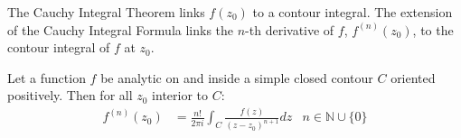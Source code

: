 \documentclass[12pt, english]{book}
\begin{document}
	
	The Cauchy Integral Theorem links \(f(z_0)\) to a contour integral. The extension of the Cauchy Integral Formula links the \(n\)-th derivative of \(f\), \(f^{(n)}(z_0)\), to the contour integral of \(f\) at \(z_0\).
	
	\begin{theorem}
		\label{Cauchy Integral Formula (Extension) - Complex}
		Let a function \(f\) be analytic on and inside a simple closed contour \(C\) oriented positively. Then for all \(z_0\) interior to \(C\):
		\begin{align*}
			f^{(n)}(z_0) &= \frac{n!}{2\pi i} \int_{C} \frac{f(z)}{(z-z_0)^{n+1}} dz & n \in \mathbb{N} \cup \{0\}
		\end{align*}
	\end{theorem}
\end{document}
